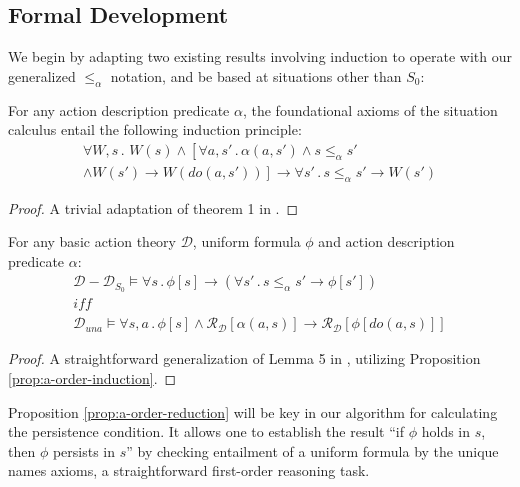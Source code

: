 \subsection{Formal Development}

We begin by adapting two existing results involving induction to operate
with our generalized $\leq_{\alpha}$ notation, and be based at situations
other than $S_{0}$:

\begin{prop}
For any action description predicate $\alpha$, the foundational axioms
of the situation calculus entail the following induction principle:\label{prop:a-order-induction}\begin{multline*}
\forall W,s\,.\,\, W(s)\wedge\left[\forall a,s'\,.\,\alpha(a,s')\wedge s\leq_{\alpha}s'\right.\\
\left.\wedge W(s')\rightarrow W(do(a,s'))\right]\rightarrow\forall s'\,.\, s\leq_{\alpha}s'\rightarrow W(s')\end{multline*}

\end{prop}
\begin{proof}
A trivial adaptation of theorem 1 in \citep{Reiter93proving}. 
\end{proof}
\begin{prop}
For any basic action theory $\mathcal{D}$, uniform formula $\phi$
and action description predicate $\alpha$:\label{prop:a-order-reduction}\begin{gather*}
\mathcal{D}-\mathcal{D}_{S_{0}}\models\forall s\,.\,\phi[s]\rightarrow\left(\forall s'\,.\, s\leq_{\alpha}s'\rightarrow\phi[s']\right)\\
\mathit{iff}\\
\mathcal{D}_{una}\models\forall s,a\,.\,\phi[s]\wedge\mathcal{R}_{\mathcal{D}}[\alpha(a,s)]\rightarrow\mathcal{R}_{\mathcal{D}}[\phi[do(a,s)]]\end{gather*}

\end{prop}
\begin{proof}
A straightforward generalization of Lemma 5 in \citep{Lin94-StateConstraints},
utilizing Proposition \ref{prop:a-order-induction}. 
\end{proof}
Proposition \ref{prop:a-order-reduction} will be key in our algorithm
for calculating the persistence condition. It allows one to establish
the result {}``if $\phi$ holds in $s$, then $\phi$ persists in
$s$'' by checking entailment of a uniform formula by the unique
names axioms, a straightforward first-order reasoning task.

